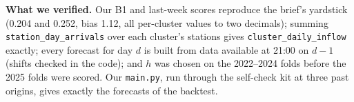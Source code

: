 \documentclass[10pt,a4paper]{article}
\begin{document}
\textbf{What we verified.} Our B1 and last-week scores reproduce the brief's yardstick (0.204 and
0.252, bias 1.12, all per-cluster values to two decimals); summing \texttt{station\_day\_arrivals}
over each cluster's stations gives \texttt{cluster\_daily\_inflow} exactly; every forecast for
day $d$ is built from data available at 21:00 on $d-1$ (shifts checked in the code); and $h$ was
chosen on the 2022--2024 folds before the 2025 folds were scored. Our \texttt{main.py}, run
through the self-check kit at three past origins, gives exactly the forecasts of the backtest.
\end{document}
